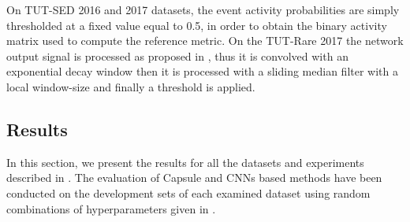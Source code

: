 On TUT-SED 2016 and 2017 datasets, the event activity probabilities are simply thresholded at a fixed value equal to 0.5, in order to obtain the binary activity matrix used to compute the reference metric. On the TUT-Rare 2017 the network output signal is processed as proposed in \cite{vesperini2018hierarchic}, thus it is convolved with an exponential decay window then it is processed with a sliding median filter with a local window-size and finally a threshold is applied.

\subsection{Results}
\label{sec:results}

In this section, we present the results for all the datasets and experiments described in . The evaluation of Capsule and CNNs based methods have been conducted on the development sets of each examined dataset using random combinations of hyperparameters given in . %

